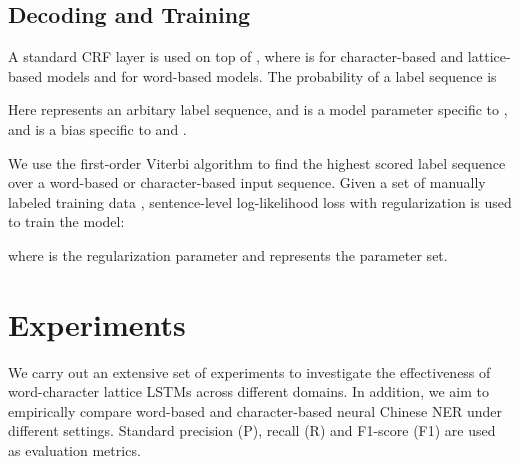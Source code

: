 \documentclass[11pt,a4paper]{article}
\begin{document}
\begin{CJK*}{UTF8}{gbsn}
\subsection{Decoding and Training}
A standard CRF layer is used on top of , where  is  for character-based and lattice-based models and  for word-based models. The probability of a label sequence  is

Here  represents an arbitary label sequence, and  is  a model parameter specific to , and  is a bias specific to  and .

We use the first-order Viterbi algorithm to find the highest scored label sequence over a word-based or character-based input sequence. Given a set of manually labeled training data , sentence-level log-likelihood loss with  regularization is used to train the model:

where  is the  regularization parameter and  represents the parameter set.

\begin{table}[!tp]
\begin{center}
\end{center}
\caption{Statistics of datasets.}
\label{tab:OverallSta}
\end{table}



\section{Experiments} 
We carry out an extensive set of experiments to investigate the effectiveness of word-character lattice LSTMs across different domains. In addition, we aim to empirically compare word-based and character-based neural Chinese NER under different settings. Standard precision (P), recall (R) and F1-score (F1) are used as evaluation metrics.


\end{CJK*}
\end{document}
